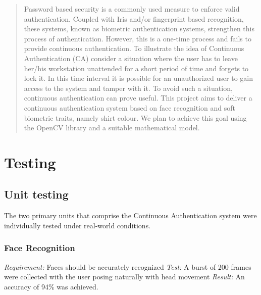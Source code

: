 \documentclass[12pt]{article}			%
\begin{document}
\newpage
\begin{abstract}			%


Password based security is a commonly used measure to enforce valid authentication. Coupled with Iris and/or fingerprint based recognition, these systems, known as biometric authentication systems, strengthen this process of authentication. However, this is a one-time process and fails to provide continuous authentication. To illustrate the idea of Continuous Authentication (CA) consider a situation where the user has to leave her/his workstation unattended for a short period of time and forgets to lock it. In this time interval it is possible for an unauthorized user to gain access to the system and tamper with it. To avoid such a situation, continuous authentication can prove useful. 
This project aims to deliver a continuous authentication system based on face recognition and soft biometric traits, namely shirt colour. We plan to achieve this goal using the OpenCV library and a suitable mathematical model.


\end{abstract}				%

\newpage				%
\tableofcontents			%
\newpage				%



\section{ Testing }

\subsection{ Unit testing }
The two primary units that comprise the Continuous Authentication system were individually tested under real-world conditions.

\subsubsection{ Face Recognition }
\emph{ Requirement: } Faces should be accurately recognized
\emph{ Test: } A burst of 200 frames were collected with the user posing naturally with head movement
\emph{ Result: } An accuracy of 94\% was achieved.
\end{document}
